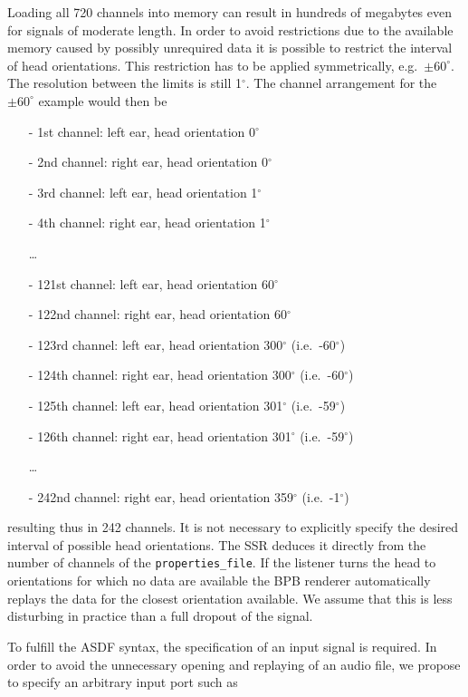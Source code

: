Loading all 720 channels into memory can result in hundreds of
megabytes even for signals of moderate length. In order to avoid
restrictions due to the available memory caused by possibly unrequired 
data it is possible to restrict the interval of head
orientations. This restriction has to be applied symmetrically,
e.g.~$\pm60^\circ$. The resolution between the limits is still
1$^\circ$. The channel arrangement for the $\pm60^\circ$ example
would then be
%
\begin{itemize}
\item[-] 1st channel: left ear, head orientation 0$^\circ$
\item[-] 2nd channel: right ear, head orientation 0$^\circ$
\item[-] 3rd channel: left ear, head orientation 1$^\circ$
\item[-] 4th channel: right ear, head orientation 1$^\circ$
\item[] \dots
\item[-] 121st channel: left ear, head orientation 60$^\circ$
\item[-] 122nd channel: right ear, head orientation 60$^\circ$
\item[-] 123rd channel: left ear, head orientation 300$^\circ$ (i.e.~-60$^\circ$)
\item[-] 124th channel: right ear, head orientation 300$^\circ$ (i.e.~-60$^\circ$)
\item[-] 125th channel: left ear, head orientation 301$^\circ$ (i.e.~-59$^\circ$)
\item[-] 126th channel: right ear, head orientation 301$^\circ$ (i.e.~-59$^\circ$)
\item[] \dots
\item[-] 242nd channel: right ear, head orientation 359$^\circ$ (i.e.~-1$^ \circ$)
\end{itemize}
%
resulting thus in 242 channels. It is not necessary to explicitly
specify the desired interval of possible head orientations. The SSR deduces it 
directly from the number of channels of the
\texttt{properties\_file}. If the listener turns the head to
orientations for which no data are available the BPB renderer
automatically replays the data for the closest orientation available.
We assume that this is less disturbing in practice than a full
dropout of the signal.

To fulfill the ASDF syntax, the specification of an input signal is
required. In order to avoid the unnecessary opening and replaying of
an audio file, we propose to specify an arbitrary input port such as

